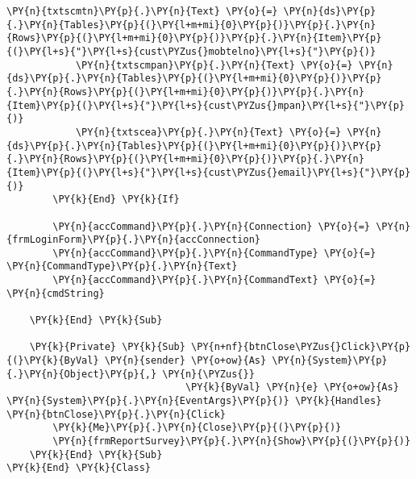 \begin{Verbatim}[commandchars=\\\{\}]
            \PY{n}{txtscmtn}\PY{p}{.}\PY{n}{Text} \PY{o}{=} \PY{n}{ds}\PY{p}{.}\PY{n}{Tables}\PY{p}{(}\PY{l+m+mi}{0}\PY{p}{)}\PY{p}{.}\PY{n}{Rows}\PY{p}{(}\PY{l+m+mi}{0}\PY{p}{)}\PY{p}{.}\PY{n}{Item}\PY{p}{(}\PY{l+s}{"}\PY{l+s}{cust\PYZus{}mobtelno}\PY{l+s}{"}\PY{p}{)}
            \PY{n}{txtscmpan}\PY{p}{.}\PY{n}{Text} \PY{o}{=} \PY{n}{ds}\PY{p}{.}\PY{n}{Tables}\PY{p}{(}\PY{l+m+mi}{0}\PY{p}{)}\PY{p}{.}\PY{n}{Rows}\PY{p}{(}\PY{l+m+mi}{0}\PY{p}{)}\PY{p}{.}\PY{n}{Item}\PY{p}{(}\PY{l+s}{"}\PY{l+s}{cust\PYZus{}mpan}\PY{l+s}{"}\PY{p}{)}
            \PY{n}{txtscea}\PY{p}{.}\PY{n}{Text} \PY{o}{=} \PY{n}{ds}\PY{p}{.}\PY{n}{Tables}\PY{p}{(}\PY{l+m+mi}{0}\PY{p}{)}\PY{p}{.}\PY{n}{Rows}\PY{p}{(}\PY{l+m+mi}{0}\PY{p}{)}\PY{p}{.}\PY{n}{Item}\PY{p}{(}\PY{l+s}{"}\PY{l+s}{cust\PYZus{}email}\PY{l+s}{"}\PY{p}{)}
        \PY{k}{End} \PY{k}{If}

        \PY{n}{accCommand}\PY{p}{.}\PY{n}{Connection} \PY{o}{=} \PY{n}{frmLoginForm}\PY{p}{.}\PY{n}{accConnection}
        \PY{n}{accCommand}\PY{p}{.}\PY{n}{CommandType} \PY{o}{=} \PY{n}{CommandType}\PY{p}{.}\PY{n}{Text}
        \PY{n}{accCommand}\PY{p}{.}\PY{n}{CommandText} \PY{o}{=} \PY{n}{cmdString}

    \PY{k}{End} \PY{k}{Sub}

    \PY{k}{Private} \PY{k}{Sub} \PY{n+nf}{btnClose\PYZus{}Click}\PY{p}{(}\PY{k}{ByVal} \PY{n}{sender} \PY{o+ow}{As} \PY{n}{System}\PY{p}{.}\PY{n}{Object}\PY{p}{,} \PY{n}{\PYZus{}}
                               \PY{k}{ByVal} \PY{n}{e} \PY{o+ow}{As} \PY{n}{System}\PY{p}{.}\PY{n}{EventArgs}\PY{p}{)} \PY{k}{Handles} \PY{n}{btnClose}\PY{p}{.}\PY{n}{Click}
        \PY{k}{Me}\PY{p}{.}\PY{n}{Close}\PY{p}{(}\PY{p}{)}
        \PY{n}{frmReportSurvey}\PY{p}{.}\PY{n}{Show}\PY{p}{(}\PY{p}{)}
    \PY{k}{End} \PY{k}{Sub}
\PY{k}{End} \PY{k}{Class}
\end{Verbatim}
